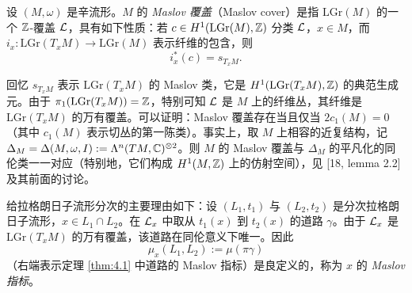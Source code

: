 \begin{definition*}
设 $(M,\omega)$ 是辛流形。$M$ 的 \emph{Maslov 覆盖}（Maslov cover）是指 $\mathrm{LGr}(M)$ 的一个 $\mathbb{Z}$-覆盖 $\mathcal{L}$，具有如下性质：若 $c\in H^1(\mathrm{LGr}(M),\mathbb{Z})$ 分类 $\mathcal{L}$，$x\in M$，而 $i_x: \mathrm{LGr}(T_xM)\to\mathrm{LGr}(M)$ 表示纤维的包含，则
\[
  i_x^*(c) = s_{T_xM}.
\]
\end{definition*}

回忆 $s_{T_xM}$ 表示 $\mathrm{LGr}(T_xM)$ 的 Maslov 类，它是 $H^1(\mathrm{LGr}(T_xM),\mathbb{Z})$ 的典范生成元。由于 $\pi_1(\mathrm{LGr}(T_xM))=\mathbb{Z}$，特别可知 $\mathcal{L}$ 是 $M$ 上的纤维丛，其纤维是 $\mathrm{LGr}(T_xM)$ 的万有覆盖。可以证明：Maslov 覆盖存在当且仅当 $2c_1(M)=0$（其中 $c_1(M)$ 表示切丛的第一陈类）。事实上，取 $M$ 上相容的近复结构，记 $\Delta_M=\Delta(M,\omega,I):=\Lambda^n(TM,\mathbb{C})^{\otimes 2}$。则 $M$ 的 Maslov 覆盖与 $\Delta_M$ 的平凡化的同伦类一一对应（特别地，它们构成 $H^1(M,\mathbb{Z})$ 上的仿射空间），见 [18, lemma 2.2] 及其前面的讨论。



给拉格朗日子流形分次的主要理由如下：设 $(L_1,t_1)$ 与 $(L_2,t_2)$ 是分次拉格朗日子流形，$x\in L_1\cap L_2$。在 $\mathcal{L}_x$ 中取从 $t_1(x)$ 到 $t_2(x)$ 的道路 $\gamma$。由于 $\mathcal{L}_x$ 是 $\mathrm{LGr}(T_xM)$ 的万有覆盖，该道路在同伦意义下唯一。因此
\[
  \mu_x(L_1,L_2) := \mu(\pi\gamma)
\]
（右端表示定理 \ref{thm:4.1} 中道路的 Maslov 指标）是良定义的，称为 $x$ 的 \emph{Maslov 指标}。


